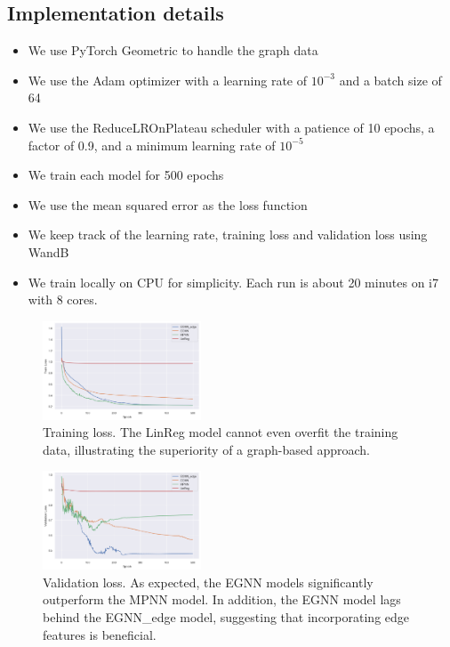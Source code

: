 \documentclass[sigconf]{acmart}
\begin{document}
\subsection{Implementation details}
\begin{itemize}
    \item We use PyTorch Geometric to handle the graph data
    \item We use the Adam optimizer with a learning rate of $10^{-3}$ and a batch size of 64
    \item We use the ReduceLROnPlateau scheduler with a patience of 10 epochs, a factor of 0.9, and a minimum learning rate of $10^{-5}$
    \item We train each model for 500 epochs
    \item We use the mean squared error as the loss function
    \item We keep track of the learning rate, training loss and validation loss using WandB
    \item We train locally on CPU for simplicity. Each run is about 20 minutes on i7 with 8 cores.
\end{itemize}

\begin{figure}
    \centering
    \includegraphics[width=0.42\textwidth]{figures/train_loss.png}
    \caption{Training loss. The LinReg model cannot even overfit the training data, illustrating the superiority of a graph-based approach.}
    \label{fig:training-loss}
\end{figure}

\begin{figure}
    \centering
    \includegraphics[width=0.42\textwidth]{figures/validation_loss.png}
    \caption{Validation loss. As expected, the EGNN models significantly outperform the MPNN model. In addition, the EGNN model lags behind the EGNN\_edge model, suggesting that incorporating edge features is beneficial.}
    \label{fig:validation-loss}
\end{figure}
\end{document}
